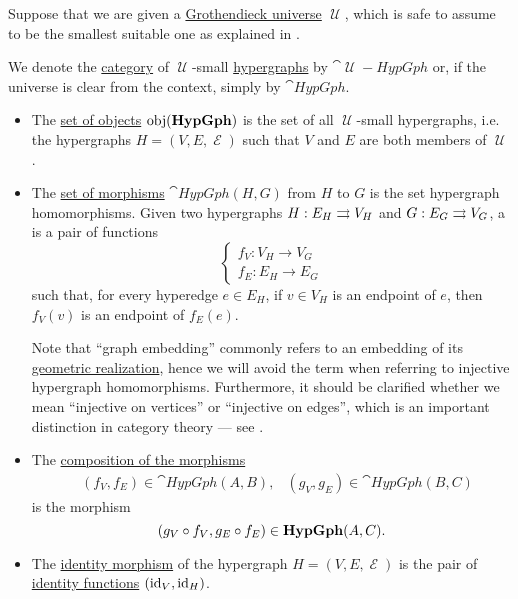 \begin{definition}\label{def:category_of_small_hypergraphs}
  Suppose that we are given a \hyperref[def:grothendieck_universe]{Grothendieck universe} \( \mscrU \), which is safe to assume to be the smallest suitable one as explained in .

  We denote the \hyperref[def:category]{category} of \( \mscrU \)-small \hyperref[def:hypergraph]{hypergraphs} by \( \cat{\mscrU-HypGph} \) or, if the universe is clear from the context, simply by \( \cat{HypGph} \).

  \begin{itemize}
    \item The \hyperref[def:category/objects]{set of objects} \( \operatorname{obj}(\operatorname{\mathbf{HypGph}}) \) is the set of all \( \mscrU \)-small hypergraphs, i.e. the hypergraphs \( H = (V, E, \mscrE) \) such that \( V \) and \( E \) are both members of \( \mscrU \).

    \item The \hyperref[def:category/morphisms]{set of morphisms} \( \cat{HypGph}(H, G) \) from \( H \) to \( G \) is the set hypergraph homomorphisms. Given two hypergraphs \( H: E_H \rightrightarrows V_H \) and \( G: E_G \rightrightarrows V_G \), a  is a pair of functions
    \begin{equation}\label{eq:def:category_of_small_hypergraphs/homomorphism}
      \begin{cases}
        f_V: V_H \to V_G \\
        f_E: E_H \to E_G
      \end{cases}
    \end{equation}
    such that, for every hyperedge \( e \in E_H \), if \( v \in V_H \) is an endpoint of \( e \), then \( f_V(v) \) is an endpoint of \( f_E(e) \).

    Note that \enquote{graph embedding} commonly refers to an embedding of its \hyperref[def:quiver_geometric_realization/undirected]{geometric realization}, hence we will avoid the term when referring to injective hypergraph homomorphisms. Furthermore, it should be clarified whether we mean \enquote{injective on vertices} or \enquote{injective on edges}, which is an important distinction in category theory --- see .

    \item The \hyperref[def:category/composition]{composition of the morphisms}
    \begin{align*}
      &(f_V, f_E) \in \cat{HypGph}(A, B),
      &(g_V, g_E) \in \cat{HypGph}(B, C)
    \end{align*}
    is the morphism
    \begin{equation*}
      (g_V \mathbin \circ f_V, g_E \mathbin \circ f_E) \in \operatorname{\mathbf{HypGph}}(A, C).
    \end{equation*}

    \item The \hyperref[def:category/identity]{identity morphism} of the hypergraph \( H = (V, E, \mscrE) \) is the pair of \hyperref[def:multi_valued_function/identity]{identity functions} \( (\operatorname{id}_V, \operatorname{id}_H) \).
  \end{itemize}
\end{definition}

